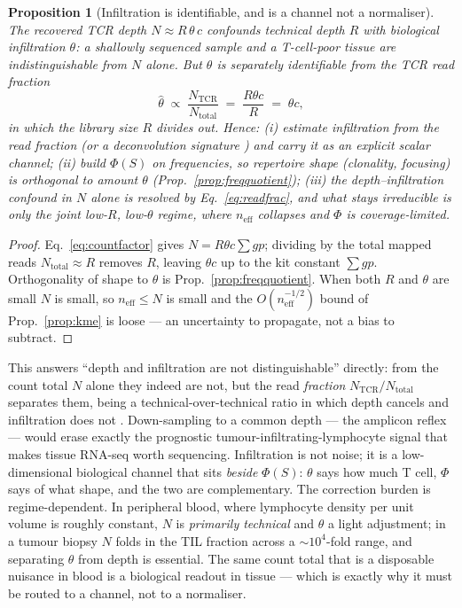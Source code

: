\documentclass[11pt]{article}
\theoremstyle{oldplain}
\newtheorem{proposition}{Proposition}
\theoremstyle{oldrem}
\begin{document}
\begin{proposition}[Infiltration is identifiable, and is a channel not a normaliser]\label{prop:infiltration}
The recovered {\scshape TCR} depth $N\approx R\,\theta\,c$ confounds technical depth $R$ with biological
infiltration $\theta$: a shallowly sequenced sample and a T-cell-poor tissue are indistinguishable from $N$
alone. But $\theta$ is separately identifiable from the {\scshape TCR} read \emph{fraction}
\begin{equation}\label{eq:readfrac}
  \hat\theta \;\propto\; \frac{N_{\mathrm{TCR}}}{N_{\mathrm{total}}}\;=\;\frac{R\theta c}{R}\;=\;\theta c,
\end{equation}
in which the library size $R$ divides out. Hence: \emph{(i)} estimate infiltration from the read fraction (or a
deconvolution signature \cite{Newman2015}) and carry it as an explicit scalar channel; \emph{(ii)} build
$\Phi(S)$ on frequencies, so repertoire \emph{shape} (clonality, focusing) is orthogonal to \emph{amount}
$\theta$ (Prop.~\ref{prop:freqquotient}); \emph{(iii)} the depth--infiltration confound in $N$ alone is resolved
by Eq.~\eqref{eq:readfrac}, and what stays irreducible is only the joint low-$R$, low-$\theta$ regime, where
$n_{\mathrm{eff}}$ collapses and $\Phi$ is coverage-limited.
\end{proposition}
\begin{proof}
Eq.~\eqref{eq:countfactor} gives $N=R\theta c\sum g p$; dividing by the total mapped reads
$N_{\mathrm{total}}\approx R$ removes $R$, leaving $\theta c$ up to the kit constant $\sum g p$. Orthogonality of
shape to $\theta$ is Prop.~\ref{prop:freqquotient}. When both $R$ and $\theta$ are small $N$ is small, so
$n_{\mathrm{eff}}\le N$ is small and the $O(n_{\mathrm{eff}}^{-1/2})$ bound of Prop.~\ref{prop:kme} is loose ---
an uncertainty to propagate, not a bias to subtract. \end{proof}

This answers ``depth and infiltration are not distinguishable'' directly: from the count total $N$ alone they
indeed are not, but the read \emph{fraction} $N_{\mathrm{TCR}}/N_{\mathrm{total}}$ separates them, being a
technical-over-technical ratio in which depth cancels and infiltration does not \cite{Bolotin2017}. Down-sampling
to a common depth --- the amplicon reflex --- would erase exactly the prognostic tumour-infiltrating-lymphocyte
signal that makes tissue {\scshape RNA}-seq worth sequencing. Infiltration is not noise; it is a low-dimensional
biological channel that sits \emph{beside} $\Phi(S)$: $\theta$ says how much T cell, $\Phi$ says of what shape,
and the two are complementary. The correction burden is regime-dependent. In peripheral blood, where lymphocyte
density per unit volume is roughly constant, $N$ is \emph{primarily technical} and $\theta$ a light adjustment;
in a tumour biopsy $N$ folds in the {\scshape TIL} fraction across a ${\sim}10^4$-fold range, and separating
$\theta$ from depth is essential. The same count total that is a disposable nuisance in blood is a biological
readout in tissue --- which is exactly why it must be routed to a channel, not to a normaliser.
\end{document}
